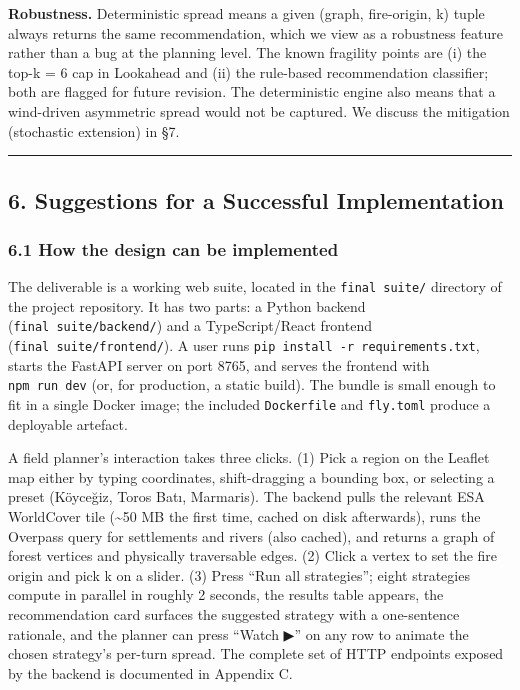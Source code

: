 \documentclass[
  11pt,
]{article}
\begin{document}
\textbf{Robustness.} Deterministic spread means a given (graph,
fire-origin, k) tuple always returns the same recommendation, which we
view as a robustness feature rather than a bug at the planning level.
The known fragility points are (i) the top-k = 6 cap in Lookahead and
(ii) the rule-based recommendation classifier; both are flagged for
future revision. The deterministic engine also means that a wind-driven
asymmetric spread would not be captured. We discuss the mitigation
(stochastic extension) in §7.

\begin{center}\rule{0.5\linewidth}{0.5pt}\end{center}

\subsection{6. Suggestions for a Successful
Implementation}\label{suggestions-for-a-successful-implementation}

\subsubsection{6.1 How the design can be
implemented}\label{how-the-design-can-be-implemented}

The deliverable is a working web suite, located in the
\texttt{final\ suite/} directory of the project repository. It has two
parts: a Python backend (\texttt{final\ suite/backend/}) and a
TypeScript/React frontend (\texttt{final\ suite/frontend/}). A user runs
\texttt{pip\ install\ -r\ requirements.txt}, starts the FastAPI server
on port 8765, and serves the frontend with \texttt{npm\ run\ dev} (or,
for production, a static build). The bundle is small enough to fit in a
single Docker image; the included \texttt{Dockerfile} and
\texttt{fly.toml} produce a deployable artefact.

A field planner's interaction takes three clicks. (1) Pick a region on
the Leaflet map either by typing coordinates, shift-dragging a bounding
box, or selecting a preset (Köyceğiz, Toros Batı, Marmaris). The backend
pulls the relevant ESA WorldCover tile (\textasciitilde50 MB the first
time, cached on disk afterwards), runs the Overpass query for
settlements and rivers (also cached), and returns a graph of forest
vertices and physically traversable edges. (2) Click a vertex to set the
fire origin and pick k on a slider. (3) Press ``Run all strategies'';
eight strategies compute in parallel in roughly 2 seconds, the results
table appears, the recommendation card surfaces the suggested strategy
with a one-sentence rationale, and the planner can press ``Watch ▶'' on
any row to animate the chosen strategy's per-turn spread. The complete
set of HTTP endpoints exposed by the backend is documented in Appendix
C.
\end{document}
